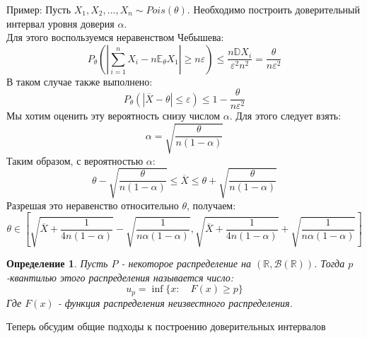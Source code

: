 \documentclass[a4paper,12pt]{article}
\newcommand{\expec}{\mathbb{E}}
\newcommand{\disp}{\mathbb{D}}
\newcommand{\sumin}{\sum\limits_{i=1}^n}
\newcommand{\sample}{X_1, X_2, ..., X_n}
\newcommand{\R}{\mathbb{R}}
\newtheorem{dfn}{Определение}[section]
\theoremstyle{named}
\begin{document}
Пример: Пусть $\sample \sim Pois(\theta)$. Необходимо построить доверительный интервал уровня доверия $\alpha$. \\
Для этого воспользуемся неравенством Чебышева:
$$
    P_\theta(|\sumin X_i - n\expec_\theta X_1| \geq n\varepsilon) \leq \frac{n\disp X_i}{\varepsilon^2n^2} 
    = \frac{\theta}{n\varepsilon^2}
$$
В таком случае также выполнено:
$$
    P_\theta(|\overline{X} - \theta| \leq \varepsilon) \leq 1 - \frac{\theta}{n\varepsilon^2}
$$
Мы хотим оценить эту вероятность снизу числом $\alpha$. Для этого следует взять:
$$
    \alpha = \sqrt{\frac{\theta}{n(1-\alpha)}}
$$
Таким образом, с вероятностью $\alpha$:
$$
    \theta - \sqrt{\frac{\theta}{n(1-\alpha)}} \leq \overline{X} \leq \theta + \sqrt{\frac{\theta}{n(1-\alpha)}} 
$$
Разрешая это неравенство относительно $\theta$, получаем:
$$
    \theta \in [\sqrt{\overline{X} + \frac{1}{4n(1-\alpha)}} - \sqrt{\frac{1}{n\alpha(1-\alpha)}}, 
    \sqrt{\overline{X} + \frac{1}{4n(1-\alpha)}} + \sqrt{\frac{1}{n\alpha(1-\alpha)}}]
$$
\begin{dfn}
    Пусть $P$ - некоторое распределение на $(\R, \mathcal{B}(\R))$. Тогда $p$-квантилью этого распределения называется число:
    $$
        u_p = \inf \{x : \quad F(x) \geq p \}
    $$
    Где $F(x)$ - функция распределения неизвестного распределения. 
\end{dfn}
Теперь обсудим общие подходы к построению доверительных интервалов
\end{document}
